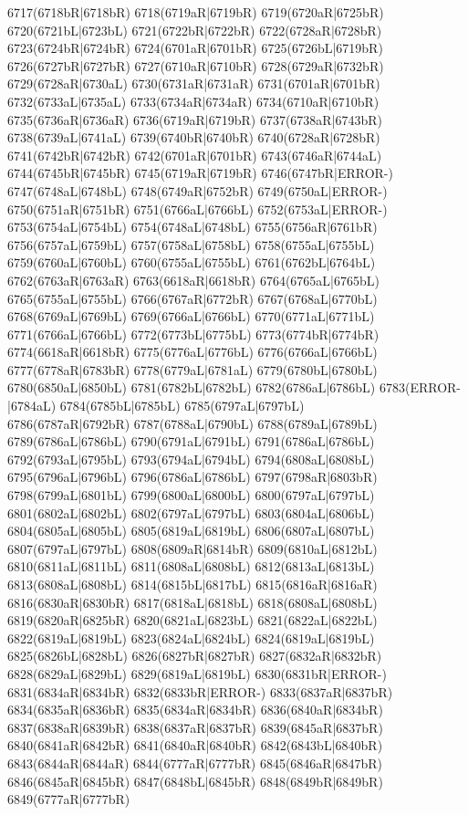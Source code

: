 6717(6718bR|6718bR) 6718(6719aR|6719bR) 6719(6720aR|6725bR) 6720(6721bL|6723bL) 6721(6722bR|6722bR) 6722(6728aR|6728bR) \\6723(6724bR|6724bR) 6724(6701aR|6701bR) 6725(6726bL|6719bR) 6726(6727bR|6727bR) 6727(6710aR|6710bR) 6728(6729aR|6732bR) 6729(6728aR|6730aL) 6730(6731aR|6731aR) 6731(6701aR|6701bR) \\6732(6733aL|6735aL) 6733(6734aR|6734aR) 6734(6710aR|6710bR) 6735(6736aR|6736aR) 6736(6719aR|6719bR) 6737(6738aR|6743bR) 6738(6739aL|6741aL) 6739(6740bR|6740bR) 6740(6728aR|6728bR) \\6741(6742bR|6742bR) 6742(6701aR|6701bR) 6743(6746aR|6744aL) 6744(6745bR|6745bR) 6745(6719aR|6719bR) 6746(6747bR|ERROR-) 6747(6748aL|6748bL) 6748(6749aR|6752bR) 6749(6750aL|ERROR-) \\6750(6751aR|6751bR) 6751(6766aL|6766bL) 6752(6753aL|ERROR-) 6753(6754aL|6754bL) 6754(6748aL|6748bL) 6755(6756aR|6761bR) 6756(6757aL|6759bL) 6757(6758aL|6758bL) 6758(6755aL|6755bL) \\6759(6760aL|6760bL) 6760(6755aL|6755bL) 6761(6762bL|6764bL) 6762(6763aR|6763aR) 6763(6618aR|6618bR) 6764(6765aL|6765bL) 6765(6755aL|6755bL) 6766(6767aR|6772bR) 6767(6768aL|6770bL) \\6768(6769aL|6769bL) 6769(6766aL|6766bL) 6770(6771aL|6771bL) 6771(6766aL|6766bL) 6772(6773bL|6775bL) 6773(6774bR|6774bR) 6774(6618aR|6618bR) 6775(6776aL|6776bL) 6776(6766aL|6766bL) \\6777(6778aR|6783bR) 6778(6779aL|6781aL) 6779(6780bL|6780bL) 6780(6850aL|6850bL) 6781(6782bL|6782bL) 6782(6786aL|6786bL) 6783(ERROR-|6784aL) 6784(6785bL|6785bL) 6785(6797aL|6797bL) \\6786(6787aR|6792bR) 6787(6788aL|6790bL) 6788(6789aL|6789bL) 6789(6786aL|6786bL) 6790(6791aL|6791bL) 6791(6786aL|6786bL) 6792(6793aL|6795bL) 6793(6794aL|6794bL) 6794(6808aL|6808bL) \\6795(6796aL|6796bL) 6796(6786aL|6786bL) 6797(6798aR|6803bR) 6798(6799aL|6801bL) 6799(6800aL|6800bL) 6800(6797aL|6797bL) 6801(6802aL|6802bL) 6802(6797aL|6797bL) 6803(6804aL|6806bL) \\6804(6805aL|6805bL) 6805(6819aL|6819bL) 6806(6807aL|6807bL) 6807(6797aL|6797bL) 6808(6809aR|6814bR) 6809(6810aL|6812bL) 6810(6811aL|6811bL) 6811(6808aL|6808bL) 6812(6813aL|6813bL) \\6813(6808aL|6808bL) 6814(6815bL|6817bL) 6815(6816aR|6816aR) 6816(6830aR|6830bR) 6817(6818aL|6818bL) 6818(6808aL|6808bL) 6819(6820aR|6825bR) 6820(6821aL|6823bL) 6821(6822aL|6822bL) \\6822(6819aL|6819bL) 6823(6824aL|6824bL) 6824(6819aL|6819bL) 6825(6826bL|6828bL) 6826(6827bR|6827bR) 6827(6832aR|6832bR) 6828(6829aL|6829bL) 6829(6819aL|6819bL) 6830(6831bR|ERROR-) \\6831(6834aR|6834bR) 6832(6833bR|ERROR-) 6833(6837aR|6837bR) 6834(6835aR|6836bR) 6835(6834aR|6834bR) 6836(6840aR|6834bR) 6837(6838aR|6839bR) 6838(6837aR|6837bR) 6839(6845aR|6837bR) \\6840(6841aR|6842bR) 6841(6840aR|6840bR) 6842(6843bL|6840bR) 6843(6844aR|6844aR) 6844(6777aR|6777bR) 6845(6846aR|6847bR) 6846(6845aR|6845bR) 6847(6848bL|6845bR) 6848(6849bR|6849bR) \\6849(6777aR|6777bR) 
